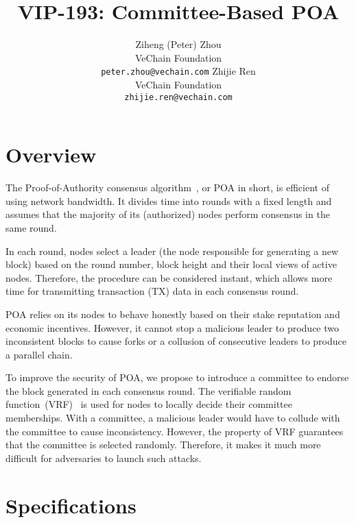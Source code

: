 \documentclass{article}
\title{VIP-193: Committee-Based POA}
\author{
  Ziheng (Peter) Zhou \vspace{1ex}\\
  VeChain Foundation \\
  \texttt{peter.zhou@vechain.com}
  \And
  Zhijie Ren \vspace{1ex} \\
  VeChain Foundation \\
  \texttt{zhijie.ren@vechain.com}
}
\date{}
\begin{document}
\maketitle




\section{Overview}
The Proof-of-Authority consensus algorithm~\cite{VWP18}, or POA in short, is efficient of using network bandwidth. It divides time into rounds with a fixed length and assumes that the majority of its (authorized) nodes perform consensus in the same round. 

In each round, nodes select a leader (the node responsible for generating a new block) based on the round number, block height and their local views of active nodes. Therefore, the procedure can be considered instant, which allows more time for transmitting transaction (TX) data in each consensus round.

POA relies on its nodes to behave honestly based on their stake reputation and economic incentives. However, it cannot stop a malicious leader to produce two inconsistent blocks to cause forks or a collusion of consecutive leaders to produce a parallel chain.

To improve the security of POA, we propose to introduce a committee to endorse the block generated in each consensus round. The verifiable random function~(VRF)~\cite{PapEtAl99} is used for nodes to locally decide their committee memberships. With a committee, a malicious leader would have to collude with the committee to cause inconsistency. However, the property of VRF guarantees that the committee is selected randomly. Therefore, it makes it much more difficult for adversaries to launch such attacks.  

\section{Specifications}
\end{document}
